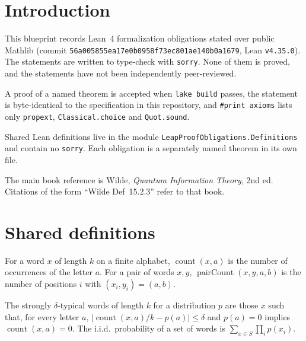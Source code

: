 
\chapter{Introduction}

This blueprint records Lean~4 formalization obligations stated over public
Mathlib (commit \texttt{56a005855ea17e0b0958f73ec801ae140b0a1679}, Lean
\texttt{v4.35.0}). The statements are written to type-check with
\texttt{sorry}. None of them is proved, and the statements have not been
independently peer-reviewed.

A proof of a named theorem is accepted when \texttt{lake build} passes, the
statement is byte-identical to the specification in this repository, and
\texttt{\#print axioms} lists only \texttt{propext}, \texttt{Classical.choice}
and \texttt{Quot.sound}.

Shared Lean definitions live in the module \texttt{LeapProofObligations.Definitions}
and contain no \texttt{sorry}. Each obligation is a separately named theorem in
its own file.

The main book reference is Wilde, \emph{Quantum Information Theory}, 2nd ed.
Citations of the form ``Wilde Def~15.2.3'' refer to that book.

\chapter{Shared definitions}

\begin{definition}
  \label{def:count}
  For a word $x$ of length $k$ on a finite alphabet, $\operatorname{count}(x,a)$
  is the number of occurrences of the letter $a$. For a pair of words $x,y$,
  $\operatorname{pairCount}(x,y,a,b)$ is the number of positions $i$ with
  $(x_i,y_i)=(a,b)$.
\end{definition}

\begin{definition}
  \label{def:strongTypical}
  The strongly $\delta$-typical words of length $k$ for a distribution $p$ are
  those $x$ such that, for every letter $a$,
  $\bigl|\operatorname{count}(x,a)/k - p(a)\bigr| \le \delta$ and $p(a)=0$
  implies $\operatorname{count}(x,a)=0$. The i.i.d.\ probability of a set of
  words is $\sum_{x \in S} \prod_i p(x_i)$.
\end{definition}

